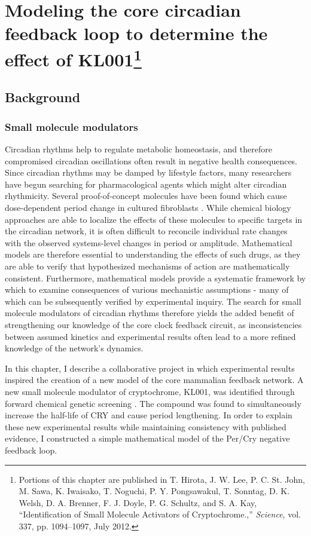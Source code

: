 \chapter[Modeling the core circadian feedback loop to determine the effect of KL001]{Modeling the core circadian feedback loop to determine the effect of KL001\footnote{ Portions of this chapter are published in T. Hirota, J. W. Lee, P. C. St. John, M. Sawa, K. Iwaisako, T. Noguchi, P. Y. Pongsawakul, T. Sonntag, D. K. Welsh, D. A. Brenner, F. J. Doyle, P. G. Schultz, and S. A. Kay, ``Identification of Small Molecule Activators of Cryptochrome.,'' {\itshape Science}, vol. 337, pp. 1094–1097, July 2012.}}\label{chap:model}

\section{Background}

\subsection{Small molecule modulators}
Circadian rhythms help to regulate metabolic homeostasis, and therefore compromised circadian oscillations often result in negative health consequences.
Since circadian rhythms may be damped by lifestyle factors, many researchers have begun searching for pharmacological agents which might alter circadian rhythmicity.
Several proof-of-concept molecules have been found which cause dose-dependent period change in cultured fibroblasts \cite{Chen2013}.
While chemical biology approaches are able to localize the effects of these molecules to specific targets in the circadian network, it is often difficult to reconcile individual rate changes with the observed systems-level changes in period or amplitude.
Mathematical models are therefore essential to understanding the effects of such drugs, as they are able to verify that hypothesized mechanisms of action are mathematically consistent.
Furthermore, mathematical models provide a systematic framework by which to examine consequences of various mechanistic assumptions - many of which can be subsequently verified by experimental inquiry.
The search for small molecule modulators of circadian rhythms therefore yields the added benefit of strengthening our knowledge of the core clock feedback circuit, as inconsistencies between assumed kinetics and experimental results often lead to a more refined knowledge of the network's dynamics.

In this chapter, I describe a collaborative project in which experimental results inspired the creation of a new model of the core mammalian feedback network.
A new small molecule modulator of cryptochrome, KL001, was identified through forward chemical genetic screening \cite{Hirota2012}.
The compound was found to simultaneously increase the half-life of CRY and cause period lengthening.
In order to explain these new experimental results while maintaining consistency with published evidence, I constructed a simple mathematical model of the Per/Cry negative feedback loop.


